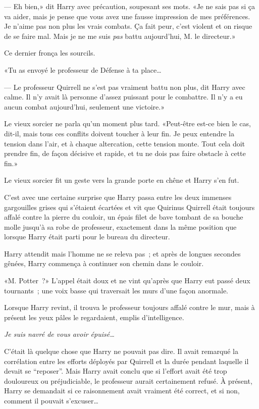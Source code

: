 --- Eh bien,» dit Harry avec précaution, soupesant ses mots. «Je ne sais pas si ça va aider, mais je pense que vous avez une fausse impression de mes préférences. Je n'aime pas non plus les vrais combats. Ça fait peur, c'est violent et on risque de se faire mal. Mais je ne me suis \emph{pas} battu aujourd'hui, M. le directeur.»

Ce dernier fronça les sourcils.

«Tu as envoyé le professeur de Défense à ta place…

--- Le professeur Quirrell ne s'est pas vraiment battu non plus, dit Harry avec calme. Il n'y avait là personne d'assez puissant pour le combattre. Il n'y a eu aucun combat aujourd'hui, seulement une victoire.»

Le vieux sorcier ne parla qu'un moment plus tard. «Peut-être est-ce bien le cas, dit-il, mais tous ces conflits doivent toucher à leur fin. Je peux entendre la tension dans l'air, et à chaque altercation, cette tension monte. Tout cela doit prendre fin, de façon décisive et rapide, et tu ne dois pas faire obstacle à cette fin.»

Le vieux sorcier fit un geste vers la grande porte en chêne et Harry s'en fut.

\later

C'est avec une certaine surprise que Harry passa entre les deux immenses gargouilles grises qui s'étaient écartées et vit que Quirinus Quirrell était toujours affalé contre la pierre du couloir, un épais filet de bave tombant de sa bouche molle jusqu'à sa robe de professeur, exactement dans la même position que lorsque Harry était parti pour le bureau du directeur.

Harry attendit mais l'homme ne se releva pas~; et après de longues secondes gênées, Harry commença à continuer son chemin dans le couloir.

«M. Potter~?» L'appel était doux et ne vint qu'après que Harry eut passé deux tournants~; une voix basse qui traversait les murs d'une façon anormale.

Lorsque Harry revint, il trouva le professeur toujours affalé contre le mur, mais à présent les yeux pâles le regardaient, emplis d'intelligence.

\emph{Je suis navré de vous avoir épuisé…}

C'était là quelque chose que Harry ne pouvait pas dire. Il avait remarqué la corrélation entre les efforts déployés par Quirrell et la durée pendant laquelle il devait se “reposer”. Mais Harry avait conclu que si l'effort avait été trop douloureux ou préjudiciable, le professeur aurait certainement refusé. À présent, Harry se demandait si ce raisonnement avait vraiment été correct, et si non, comment il pouvait s'excuser…

